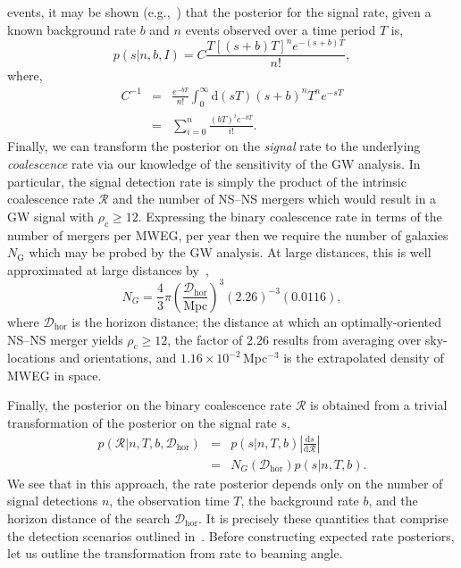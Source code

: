 \documentclass[twocolumn,nofootinbib]{revtex4-1}
\newcommand{\cbcrate}{{{\mathcal R}}}
\newcommand{\diff}{{\mathrm d}}
\newcommand{\dhor}{\ensuremath{{\mathcal D}_{\mathrm{hor}}}}
\newcommand{\mpc}{\mathrm{Mpc}}
\newcommand{\BNS}{\ac{NS}--\ac{NS}\xspace}
\begin{document}
events, it may be shown (e.g.,~\cite{2010blda.book.....G}) that the
posterior for the signal rate, given a known background rate $b$ and
$n$ events observed over a time period $T$ is,
%
\begin{equation}
p(s|n,b,I) = C \frac{ T\left[(s+b)T\right]^n e^{-(s+b)T}}{n!},
\end{equation}
%
where,
\begin{eqnarray}
C^{-1} & = &\frac{e^{-bT}}{n!} \int_0^{\infty}\diff(sT)(s+b)^n T^n e^{-sT}\\
& = & \sum_{i=0}^n \frac{ (bT)^i e^{-bT}}{i!}.
\end{eqnarray}
%
Finally, we can transform the posterior on the \emph{signal} rate to
the underlying \emph{coalescence} rate via our knowledge of the
sensitivity of the \ac{GW} analysis.  In particular, the signal
detection rate is simply the product of the intrinsic coalescence rate
$\cbcrate$ and the number of \BNS mergers which would result in a
\ac{GW} signal with $\rho_c\geq12$.  Expressing the binary coalescence
rate in terms of the number of mergers per \ac{MWEG}, per year then we
require the number of galaxies $N_{\mathrm{G}}$ which may be probed by
the \ac{GW} analysis.  At large distances, this is well approximated
at large distances by~\cite{rates_paper},
%
\begin{equation}
    N_G = \frac{4}{3} \pi \left( \frac{\dhor}{\mpc}
\right)^3 (2.26)^{-3} (0.0116),
\end{equation}
%
where $\dhor$ is the horizon distance; the distance at which an
optimally-oriented \BNS merger yields $\rho_c\geq12$, the factor of
2.26 results from averaging over sky-locations and orientations, and
$1.16\times 10^{-2}$\,Mpc$^{-3}$ is the extrapolated density of
\ac{MWEG} in space.

Finally, the posterior on the binary coalescence rate $\cbcrate$ is obtained from a trivial transformation of the posterior on the signal rate $s$,
%
\begin{eqnarray}
    p(\cbcrate|n,T,b,\dhor) & = & p(s|n,T,b) \left|\frac{\diff s}{\diff \cbcrate}\right| \\
                                   & = & N_G(\dhor)p(s|n,T,b).
\end{eqnarray}
%
We see that in this approach, the rate posterior depends only on the
number of signal detections $n$, the observation time $T$, the
background rate $b$, and the horizon distance of the search $\dhor$.
It is precisely these quantities that comprise the detection scenarios
outlined in~\cite{Aasi:2013wya}.  Before constructing expected rate
posteriors, let us outline the transformation from rate to beaming
angle.
\end{document}
